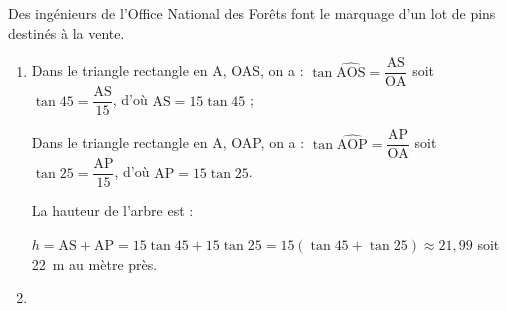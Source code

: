 
\medskip

Des ingénieurs de l'Office National des Forêts font le marquage d'un lot de pins
destinés à la vente.

\medskip

\begin{enumerate}
\item %

%
%
%
Dans le triangle rectangle en A, OAS, on a : $\tan \widehat{\text{AOS}}  = \dfrac{\text{AS}}{\text{OA}}$ soit $\tan 45 = \dfrac{\text{AS}}{15}$, d'où $\text{AS} = 15\tan 45 $ ;

Dans le triangle rectangle en A, OAP, on a : $\tan \widehat{\text{AOP}}  = \dfrac{\text{AP}}{\text{OA}}$ soit $\tan 25 = \dfrac{\text{AP}}{15}$, d'où $\text{AP} = 15\tan 25$.

La hauteur de l'arbre est :

$h = \text{AS} + \text{AP} = 15\tan 45 + 15\tan 25 = 15 (\tan 45 + \tan 25) \approx 21,99$ soit 22~m au mètre près.
\item  %



\end{enumerate}

